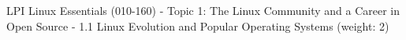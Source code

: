 LPI Linux Essentials (010-160) - Topic 1: The Linux Community and a Career in Open Source - 1.1 Linux Evolution and Popular Operating Systems (weight: 2)

